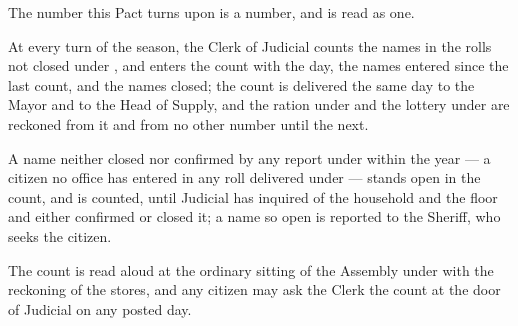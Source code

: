 The number this Pact turns upon is a number, and is read as one.

\begin{clauses}
\item At every turn of the season, the Clerk of Judicial counts the names in the rolls not closed under , and enters the count with the day, the names entered since the last count, and the names closed; the count is delivered the same day to the Mayor and to the Head of Supply, and the ration under  and the lottery under  are reckoned from it and from no other number until the next.
\item A name neither closed nor confirmed by any report under  within the year --- a citizen no office has entered in any roll delivered under  --- stands open in the count, and is counted, until Judicial has inquired of the household and the floor and either confirmed or closed it; a name so open is reported to the Sheriff, who seeks the citizen.
\item The count is read aloud at the ordinary sitting of the Assembly under  with the reckoning of the stores, and any citizen may ask the Clerk the count at the door of Judicial on any posted day.
\end{clauses}
